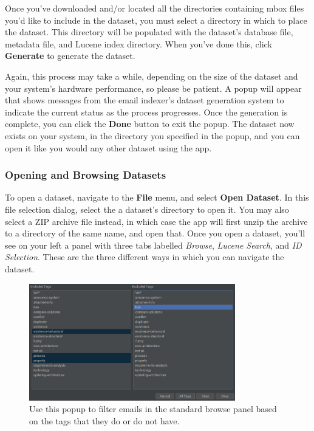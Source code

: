 \documentclass[a4paper, 12pt]{article}
\begin{document}
			Once you've downloaded and/or located all the directories containing mbox files you'd like to include in the dataset, you must select a directory in which to place the dataset. This directory will be populated with the dataset's database file, metadata file, and Lucene index directory. When you've done this, click \textbf{Generate} to generate the dataset.
			
			Again, this process may take a while, depending on the size of the dataset and your system's hardware performance, so please be patient. A popup will appear that shows messages from the email indexer's dataset generation system to indicate the current status as the process progresses. Once the generation is complete, you can click the \textbf{Done} button to exit the popup. The dataset now exists on your system, in the directory you specified in the popup, and you can open it like you would any other dataset using the app.
			
		\newpage
		\subsubsection{Opening and Browsing Datasets}
			To open a dataset, navigate to the \textbf{File} menu, and select \textbf{Open Dataset}. In this file selection dialog, select the a dataset's directory to open it. You may also select a ZIP archive file instead, in which case the app will first unzip the archive to a directory of the same name, and open that. Once you open a dataset, you'll see on your left a panel with three tabs labelled \textit{Browse}, \textit{Lucene Search}, and \textit{ID Selection}. These are the three different ways in which you can navigate the dataset.
			
			\begin{figure}[h]
				\centering
				\includegraphics[width=0.8\textwidth]{img/edb-app_tag-filter-popup.png}
				\caption{Use this popup to filter emails in the standard browse panel based on the tags that they do or do not have.}
				\label{fig:edb-app-tag-filter}
			\end{figure}
		
\end{document}
